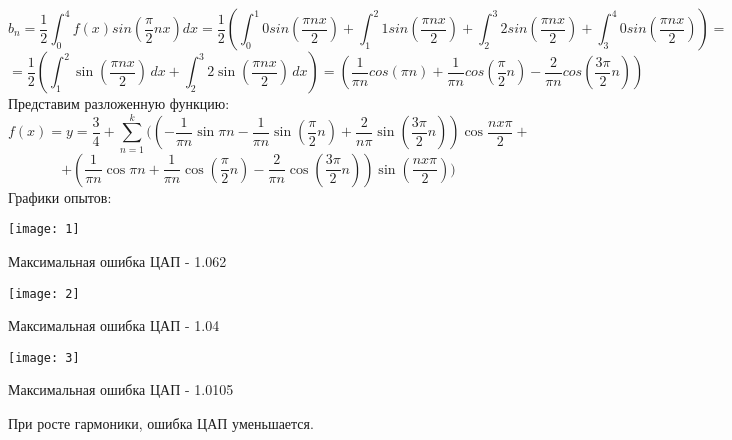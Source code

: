 \documentclass{article}
\begin{document}
\[
    b_n = \frac{1}{2}\int_{0}^{4}f(x)sin\left(\frac{\pi}{2}nx\right)dx=\frac{1}{2}\left(\int_{0}^{1}0sin\left(\frac{\pi nx}{2}\right)+\int_{1}^{2}1sin\left(\frac{\pi nx}{2}\right)+ \int_{2}^{3}2sin\left(\frac{\pi nx}{2}\right)+ \int_{3}^{4}0sin\left(\frac{\pi nx}{2}\right)\right)=
\]
\[=\frac{1}{2} \left(\int_{1}^{2} \sin\left(\frac{\pi nx}{2}\right) \, dx + \int_{2}^{3} 2 \sin\left(\frac{\pi nx}{2}\right) \, dx\right)=\left(\frac{1}{\pi n}cos(\pi n)+\frac{1}{\pi n}cos\left(\frac{\pi}{2}n\right)-\frac{2}{\pi n}cos\left(\frac{3\pi}{2}n\right)\right)\]
Представим разложенную функцию:
\[
    f(x)= y=\frac{3}{4}+\sum_{n=1}^{k}(\left(-\frac{1}{\pi n}\sin\pi n-\frac{1}{\pi n}\sin\left(\frac{\pi}{2}n\right)+\frac{2}{n\pi}\sin\left(\frac{3\pi}{2}n\right)\right)\cos\frac{nx\pi}{2}+
\]
\[
    +\left(\frac{1}{\pi n}\cos\pi n+\frac{1}{\pi n}\cos\left(\frac{\pi}{2}n\right)-\frac{2}{\pi n}\cos\left(\frac{3\pi}{2}n\right)\right)\sin\left(\frac{nx\pi}{2}\right))\
\]
Графики опытов:
\begin{center}
    \texttt{[image: 1]}
\end{center} 
Максимальная ошибка ЦАП - 1.062
\begin{center}
    \texttt{[image: 2]}
\end{center} 
Максимальная ошибка ЦАП - 1.04
\begin{center}
    \texttt{[image: 3]}
\end{center}
Максимальная ошибка ЦАП - 1.0105


При росте гармоники, ошибка ЦАП уменьшается.
\end{document}
